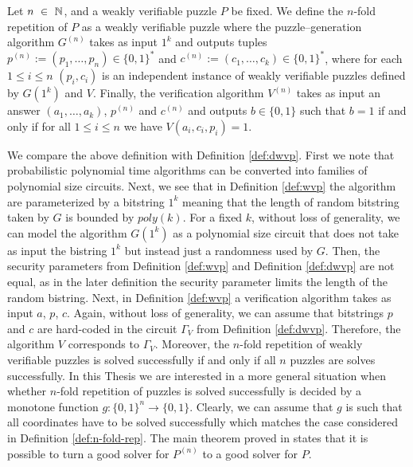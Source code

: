 \documentclass[11pt,a4paper,titlepage]{memoir}
\begin{document}
\begin{definition}
  \label{def:n-fold-rep}
  Let $n~\in~\mathbb{N}$, and a weakly verifiable puzzle $P$ be fixed.
  We define the $n$-fold repetition of $P$ as a weakly verifiable puzzle where the puzzle--generation algorithm
  $G^{(n)}$ takes as input $1^k$ and outputs tuples $p^{(n)} := (p_1, \dotsc, p_n) \in \{0,1\}^{*}$ and $c^{(n)} := (c_1, \dotsc, c_k) \in \{0,1\}^{*}$,
  where for each $1 \leq i \leq n$ $(p_i, c_i)$ is an independent instance of weakly verifiable puzzles defined by $G(1^k)$ and $V$.
  Finally, the verification algorithm $V^{(n)}$ takes as input an answer $(a_1, \dotsc, a_k)$, $p^{(n)}$ and $c^{(n)}$ and outputs $b \in \{0,1\}$
  such that $b = 1$ if and only if for all $1 \leq i \leq n$ we have $V(a_i, c_i, p_i) = 1$.
 \end{definition}
%
We compare the above definition with Definition \ref{def:dwvp}. First we note that probabilistic polynomial time algorithms can be converted
into families of polynomial size circuits. Next, we see that in Definition \ref{def:wvp} the algorithm are parameterized by
a bitstring $1^k$ meaning that the length of random bitstring
taken by $G$ is bounded by $poly(k)$. For a fixed $k$, without loss of generality, we can model the algorithm $G(1^k)$ as a polynomial size circuit
that does not take as input the bistring $1^k$ but instead just a randomness used by $G$. Then, the security parameters from Definition \ref{def:wvp} and
Definition \ref{def:dwvp} are not equal, as in the later definition the security parameter limits the length of the random bistring.
Next, in Definition \ref{def:wvp} a verification algorithm takes as input $a$, $p$, $c$.
Again, without loss of generality, we can assume that bitstrings $p$ and $c$ are hard-coded in the circuit $\Gamma_V$ from Definition \ref{def:dwvp}.
Therefore, the algorithm $V$ corresponds to $\Gamma_V$.
Moreover, the $n$-fold repetition of weakly verifiable puzzles is solved successfully if and only if all $n$ puzzles are solves successfully.
In this Thesis we are interested in a more general situation when whether $n$-fold repetition of puzzles is solved successfully is decided by a monotone function
$g: \{0,1\}^{n} \rightarrow \{0,1\}$.
Clearly, we can assume that $g$ is such that all coordinates have to be solved successfully which matches the case considered in Definition \ref{def:n-fold-rep}.
%
The main theorem proved in \cite{canetti2004hardness} states that it is possible to turn a good solver for
$P^{(n)}$ to a good solver for $P$.
\end{document}
